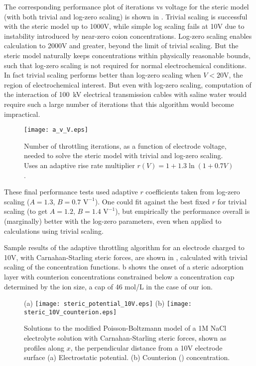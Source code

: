 The corresponding
performance plot of iterations vs voltage for the steric model
(with both trivial and log-zero scaling) is shown in .
Trivial scaling is successful with the steric model up to 1000V, while simple log
scaling fails at 10V due to instability introduced by near-zero coion
concentrations.
Log-zero scaling enables calculation to 2000V
and greater, beyond the limit of trivial scaling. But the steric model
naturally keeps concentrations within 
physically reasonable bounds, such that  log-zero scaling is not
required for normal electrochemical conditions. In fact
trivial scaling performs better than log-zero scaling when $V<20$V,
the region of electrochemical interest.
But even with log-zero scaling, computation of the interaction of
100~kV electrical transmission cables with saline water would require
such a large number of iterations that this algorithm would become impractical.

\begin{figure}
\centering
\texttt{[image: a\_v\_V.eps]}
\caption{Number of throttling iterations,  as a function of electrode
  voltage, needed to solve the steric model with trivial and log-zero scaling.
  Uses an adaptive rise rate multiplier $r(V)=1+1.3\ln(1+0.7V)$.
}
\label{fig:convergence}
\end{figure}

These final performance tests used adaptive $r$ coefficients taken from log-zero scaling ($A=1.3$,
$B=0.7 \textrm{ V}^{-1}$). One could fit against the best fixed  $r$ for trivial
scaling (to get $A=1.2$, $B=1.4 \textrm{ V}^{-1}$), but empirically
the performance overall is (marginally) better with the log-zero
parameters, even when applied to calculations using trivial scaling.




Sample results of the adaptive throttling algorithm for an electrode charged to
10V, with Carnahan-Starling steric forces, are shown in
, calculated with trivial scaling of the
concentration functions. b shows the onset
of a steric adsorption layer \citep{DagmawiParsons2022} with counterion
concentrations constrained below a concentration cap determined by the
ion size, a cap of 46 mol/L in the case of our  ion.

\begin{figure}
\centering
(a)
\texttt{[image: steric\_potential\_10V.eps]}
(b)
\texttt{[image: steric\_10V\_counterion.eps]}
\caption{\label{fig_results_throttling}Solutions to the modified
  Poisson-Boltzmann model of a 1M NaCl electrolyte solution with
  Carnahan-Starling steric forces, shown as profiles along $x$, the
  perpendicular distance from a 10V electrode surface (a) Electrostatic
  potential. (b) Counterion () concentration. }
\end{figure}

